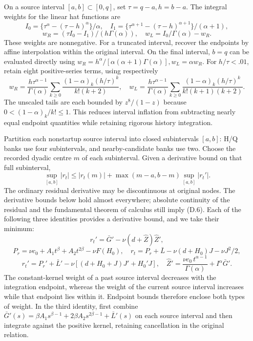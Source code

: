 \documentclass[11pt,a4paper]{article}
\begin{document}
On a source interval \([a,b]\subset[0,q]\), set \(\tau=q-a,h=b-a\). The integral weights for the linear hat functions are
\[
I_0=\{\tau^\alpha-(\tau-h)^\alpha\}/\alpha,\quad
I_1=\{\tau^{\alpha+1}-(\tau-h)^{\alpha+1}\}/(\alpha+1),
\]
\begin{equation*}\tag{D.4}
w_R=(\tau I_0-I_1)/(h\Gamma(\alpha)),\quad
w_L=I_0/\Gamma(\alpha)-w_R.
\end{equation*}
These weights are nonnegative. For a truncated interval, recover the endpoints by affine interpolation within the original interval. On the final interval, \(b=q\) can be evaluated directly using
\(w_R=h^\alpha/[\alpha(\alpha+1)\Gamma(\alpha)],w_L=\alpha w_R\).
For \(h/\tau<.01\), retain eight positive-series terms, using respectively
\begin{equation*}\tag{D.5}
w_R=\frac{h\tau^{\alpha-1}}{\Gamma(\alpha)}
\sum_{k\ge0}\frac{(1-\alpha)_k(h/\tau)^k}{k!(k+2)},\quad
w_L=\frac{h\tau^{\alpha-1}}{\Gamma(\alpha)}
\sum_{k\ge0}\frac{(1-\alpha)_k(h/\tau)^k}{k!(k+1)(k+2)}.
\end{equation*}
The unscaled tails are each bounded by \(z^8/(1-z)\) because \(0<(1-\alpha)_k/k!\le1\). This reduces interval inflation from subtracting nearly equal endpoint quantities while retaining rigorous history integration.

Partition each nonstartup source interval into closed subintervals \([a,b]\): H/Q banks use four subintervals, and nearby-candidate banks use two. Choose the recorded dyadic centre \(m\) of each subinterval. Given a derivative bound on that full subinterval,
\begin{equation*}\tag{D.6}
\sup_{[a,b]}|r_t|\le|r_t(m)|+\max(m-a,b-m)\sup_{[a,b]}|r_t'|.
\end{equation*}
The ordinary residual derivative may be discontinuous at original nodes. The derivative bounds below hold almost everywhere; absolute continuity of the residual and the fundamental theorem of calculus still imply (D.6). Each of the following three identities provides a derivative bound, and we take their minimum:
\[
r_t'=\bar G'-\nu(d+\widehat Z)\widehat Z',
\]
\[
P_r=\nu c_0+A_1t^\beta+A_2t^{2\beta}-\nu F(H_0),\quad
r_t=P_r+\bar L-\nu(d+H_0)J-\nu J^2/2,
\]
\begin{equation*}\tag{D.7}
r_t'=P_r'+\bar L'-\nu[(d+H_0+J)J'+H_0'J],
\quad
\widehat Z'=\frac{\nu c_0\,t^{\alpha-1}}{\Gamma(\alpha)}+I^\alpha\bar G'.
\end{equation*}
The constant-kernel weight of a past source interval decreases with the integration endpoint, whereas the weight of the current source interval increases while that endpoint lies within it. Endpoint bounds therefore enclose both types of weight. In the third identity, first combine
\(\bar G'(s)=\beta A_1s^{\beta-1}+2\beta A_2s^{2\beta-1}+\bar L'(s)\) on each source interval and then integrate against the positive kernel, retaining cancellation in the original relation.
\end{document}
